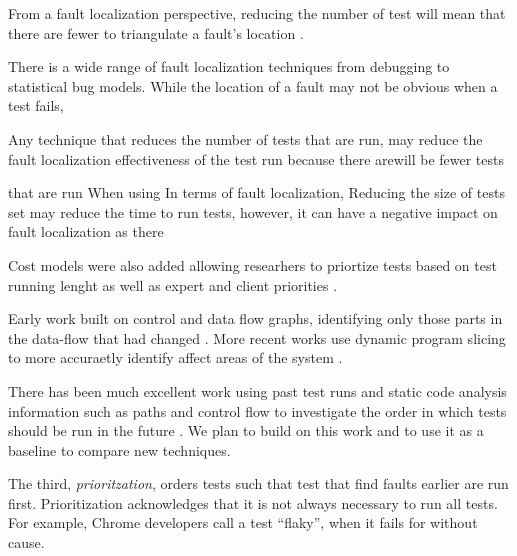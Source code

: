 From a fault localization perspective, reducing the number of test will mean
that there are fewer to triangulate a fault's location \cite{Yu2008ICSE}.

There is a wide range of fault localization techniques from debugging to statistical bug models. While the location of a fault may not be obvious when a test fails, 

 
Any technique that reduces the number of tests that are run, may reduce the
fault localization effectiveness of the test run because there arewill be fewer
tests 

 that are run When using In terms of fault localization, Reducing the size of tests set may
reduce the time to run tests, however, it can have a negative impact on fault
localization as there 

Cost models were also
added allowing researhers to priortize tests based on test running lenght
\cite{Do2008FSE} as well as expert and client priorities \cite{Yoo2009ISSTA}. 



Early work built on control and data flow graphs,
identifying only those parts in the data-flow that had changed
\cite{Taha1989COMPSAC}. More recent works use dynamic program slicing to more
accuraetly identify affect areas of the system \cite{Jeffrey2006COMPSAC}.



There has been much
excellent work using past test runs and static code analysis information such
as paths and control flow to investigate the order in which tests should be run
in the future \cite{Kim2002ICSE, Hadi, SunKim}. We plan to build on this work
and to use it as a baseline to compare new techniques.



The third, {\it prioritzation}, orders tests such that test that find faults
earlier are run first. Prioritization acknowledges that it is not always
necessary to run all tests. 
For example, Chrome developers call a test ``flaky'', when it
fails for without cause. 

